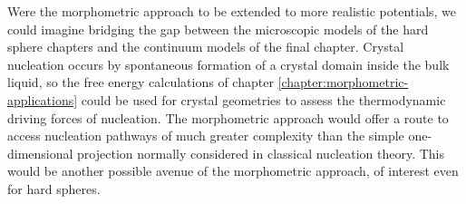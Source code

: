 \documentclass[11pt,twoside]{report}
\def\includebibliography{}
\begin{document}
Were the morphometric approach to be extended to more realistic potentials, we could imagine bridging the gap between the microscopic models of the hard sphere chapters and the continuum models of the final chapter.
Crystal nucleation occurs by spontaneous formation of a crystal domain inside the bulk liquid, so the free energy calculations of chapter \ref{chapter:morphometric-applications} could be used for crystal geometries to assess the thermodynamic driving forces of nucleation.
The morphometric approach would offer a route to access nucleation pathways of much greater complexity than the simple one-dimensional projection normally considered in classical nucleation theory.
This would be another possible avenue of the morphometric approach, of interest even for hard spheres.

\ifdefined\includebibliography
  \printbibliography
\fi
\end{document}
